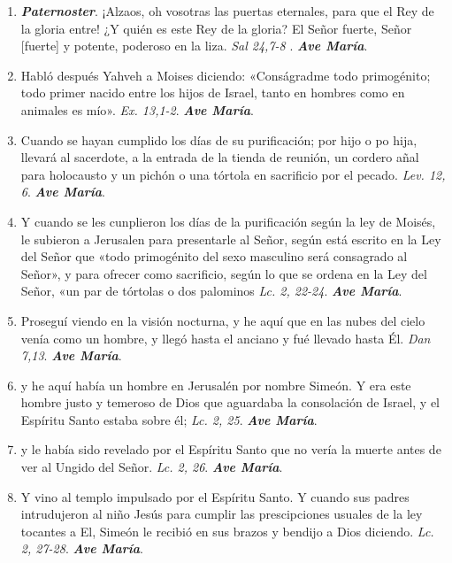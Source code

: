 \documentclass[../../devocionario.tex]{subfiles}
\begin{document}
    \begin{enumerate}
        \item \textbf{\textit{Paternoster}}. ¡Alzaos, oh vosotras las puertas eternales, para que el Rey de la gloria entre!
            ¿Y quién es este Rey de la gloria? El Señor fuerte, Señor [fuerte] y potente, poderoso en la liza. \textit{Sal 24,7-8} . \textbf{\textit{Ave María}}.

        \item Habló después Yahveh a Moises diciendo: «Conságradme todo primogénito; todo primer nacido entre los hijos de Israel, 
            tanto en hombres como en animales es mío». \textit{Ex. 13,1-2}. \textbf{\textit{Ave María}}.

        \item Cuando se hayan cumplido los días de su purificación; por hijo o po hija, llevará al sacerdote, a la entrada de la tienda de reunión, 
            un cordero añal para holocausto y un pichón o una tórtola en sacrificio por el pecado. \textit{Lev. 12, 6}. \textbf{\textit{Ave María}}.

        \item Y cuando se les cunplieron los días de la purificación según la ley de Moisés, le subieron a Jerusalen para presentarle al Señor, 
            según está escrito en la Ley del Señor que «todo primogénito del sexo masculino será consagrado al Señor», 
            y para ofrecer como sacrificio, según lo que se ordena en la Ley del Señor, 
            «un par de tórtolas o dos palominos \textit{Lc. 2, 22-24}. \textbf{\textit{Ave María}}.

        \item Proseguí viendo en la visión nocturna, y he aquí que en las nubes del cielo venía como un hombre, 
            y llegó hasta el anciano y fué llevado hasta Él. \textit{Dan 7,13}. \textbf{\textit{Ave María}}.

        \item y he aquí había un hombre en Jerusalén por nombre Simeón. Y era este hombre justo y temeroso de Dios que aguardaba la consolación de Israel, 
            y el Espíritu Santo estaba sobre él; \textit{Lc. 2, 25}. \textbf{\textit{Ave María}}.

        \item y le había sido revelado por el Espíritu Santo que no vería la muerte antes de ver al Ungido del Señor. \textit{Lc. 2, 26}. \textbf{\textit{Ave María}}.

        \item Y vino al templo impulsado por el Espíritu Santo. Y cuando sus padres intrudujeron al niño Jesús para cumplir 
            las prescipciones usuales de la ley tocantes a El, 
            Simeón le recibió en sus brazos y bendijo a Dios diciendo. \textit{Lc. 2, 27-28}. \textbf{\textit{Ave María}}.


\end{enumerate}
\end{document}
